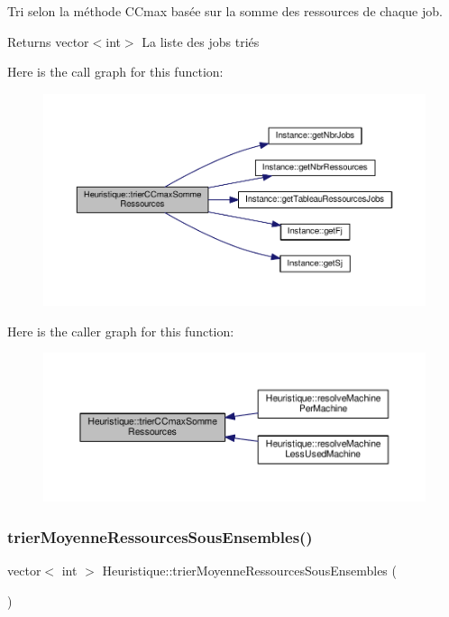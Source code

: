 Tri selon la méthode C\+Cmax basée sur la somme des ressources de chaque job. 

\begin{DoxyReturn}{Returns}
vector$<$int$>$ La liste des jobs triés 
\end{DoxyReturn}
Here is the call graph for this function\+:\nopagebreak
\begin{figure}[H]
\begin{center}
\leavevmode
\includegraphics[width=350pt]{classHeuristique_a19705558bc45437d88b750fe9cbe6125_cgraph}
\end{center}
\end{figure}
Here is the caller graph for this function\+:\nopagebreak
\begin{figure}[H]
\begin{center}
\leavevmode
\includegraphics[width=350pt]{classHeuristique_a19705558bc45437d88b750fe9cbe6125_icgraph}
\end{center}
\end{figure}
\mbox{\label{classHeuristique_a9a5a00a6b2a9f0dc792491df1d7b6c67}} 
\subsubsection{\texorpdfstring{trier\+Moyenne\+Ressources\+Sous\+Ensembles()}{trierMoyenneRessourcesSousEnsembles()}}
{\footnotesize\ttfamily vector$<$ int $>$ Heuristique\+::trier\+Moyenne\+Ressources\+Sous\+Ensembles (\begin{DoxyParamCaption}{ }\end{DoxyParamCaption})}



